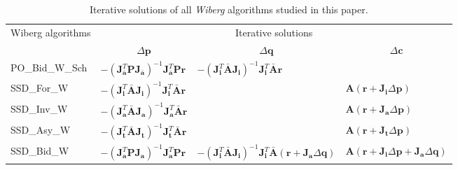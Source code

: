\begin{table*}
\begin{tabular}{llll}
\toprule
Wiberg algorithms & \multicolumn{3}{c}{Iterative solutions}
\\
& \multicolumn{1}{c}{$\Delta\mathbf{p}$} & \multicolumn{1}{c}{$\Delta\mathbf{q}$} & \multicolumn{1}{c}{$\Delta\mathbf{c}$}
\\
\midrule
\medskip
PO\_Bid\_W\_Sch 
& 
$
-\left( \mathbf{J}_{\bar{\mathbf{a}}}^T\mathbf{P}\mathbf{J}_{\bar{\mathbf{a}}} \right)^{-1} \mathbf{J}_{\bar{\mathbf{a}}}^T\mathbf{P}\mathbf{r}
$
&
$
-\left( \mathbf{J}_{\mathbf{i}}^T\bar{\mathbf{A}}\mathbf{J}_{\mathbf{i}} \right)^{-1} \mathbf{J}_{\mathbf{i}}^T\bar{\mathbf{A}}\mathbf{r}
$
&
\\
\medskip
SSD\_For\_W
& 
$
-\left( \mathbf{J}_{\mathbf{i}}^T\bar{\mathbf{A}}\mathbf{J}_{\mathbf{i}} \right)^{-1} \mathbf{J}_{\mathbf{i}}^T\bar{\mathbf{A}}\mathbf{r}
$
&
&
$
\mathbf{A} \left (\mathbf{r} + \mathbf{J}_{\mathbf{i}}\Delta\mathbf{p} \right)
$
\\
\medskip
SSD\_Inv\_W
& 
$
-\left( \mathbf{J}_{\mathbf{a}}^T\bar{\mathbf{A}}\mathbf{J}_{\mathbf{a}} \right)^{-1} \mathbf{J}_{\mathbf{a}}^T\bar{\mathbf{A}}\mathbf{r}
$
&
&
$
\mathbf{A} \left (\mathbf{r} + \mathbf{J}_{\mathbf{a}}\Delta\mathbf{p} \right)
$
\\
\medskip
SSD\_Asy\_W 
& 
$
-\left( \mathbf{J}_{\mathbf{t}}^T\bar{\mathbf{A}}\mathbf{J}_{\mathbf{t}} \right)^{-1} \mathbf{J}_{\mathbf{t}}^T\bar{\mathbf{A}}\mathbf{r}
$
&
&
$
\mathbf{A} \left (\mathbf{r} + \mathbf{J}_{\mathbf{t}}\Delta\mathbf{p} \right)
$
\\
\medskip
SSD\_Bid\_W 
& 
$
-\left( \mathbf{J}_{\mathbf{a}}^T\mathbf{P}\mathbf{J}_{\mathbf{a}} \right)^{-1} \mathbf{J}_{\mathbf{a}}^T\mathbf{P}\mathbf{r}
$
&
$	
-\left( \mathbf{J}_{\mathbf{i}}^T\bar{\mathbf{A}}\mathbf{J}_{\mathbf{i}} \right)^{-1} \mathbf{J}_{\mathbf{i}}^T\bar{\mathbf{A}}\left( \mathbf{r} + \mathbf{J}_{\mathbf{a}}\Delta\mathbf{q} \right)
$
&
$
\mathbf{A} \left( \mathbf{r} + \mathbf{J}_{\mathbf{i}}\Delta\mathbf{p} + \mathbf{J}_{\mathbf{a}} \Delta\mathbf{q} \right)
$
\\
\bottomrule
\end{tabular}
\caption{Iterative solutions of all \emph{Wiberg} algorithms studied in this paper.}
\label{tab:w_solution}
\end{table*}


